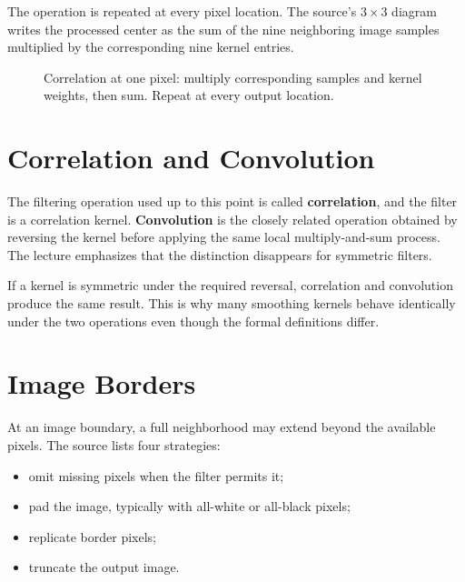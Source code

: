\documentclass[11pt,a4paper,oneside]{report}
\begin{document}
The operation is repeated at every pixel location. The source's $3\times3$ diagram writes the processed center as the sum of the nine neighboring image samples multiplied by the corresponding nine kernel entries.

\begin{figure}[!htbp]
\centering
{}
\caption{Correlation at one pixel: multiply corresponding samples and kernel weights, then sum. Repeat at every output location.}
\label{fig:spatial-filter-process}
\end{figure}

\section{Correlation and Convolution}

The filtering operation used up to this point is called \textbf{correlation}, and the filter is a correlation kernel. \textbf{Convolution} is the closely related operation obtained by reversing the kernel before applying the same local multiply-and-sum process. The lecture emphasizes that the distinction disappears for symmetric filters.

\begin{keyconcept}
If a kernel is symmetric under the required reversal, correlation and convolution produce the same result. This is why many smoothing kernels behave identically under the two operations even though the formal definitions differ.
\end{keyconcept}

\section{Image Borders}

At an image boundary, a full neighborhood may extend beyond the available pixels. The source lists four strategies:
\begin{itemize}
  \item omit missing pixels when the filter permits it;
  \item pad the image, typically with all-white or all-black pixels;
  \item replicate border pixels;
  \item truncate the output image.
\end{itemize}
\end{document}
